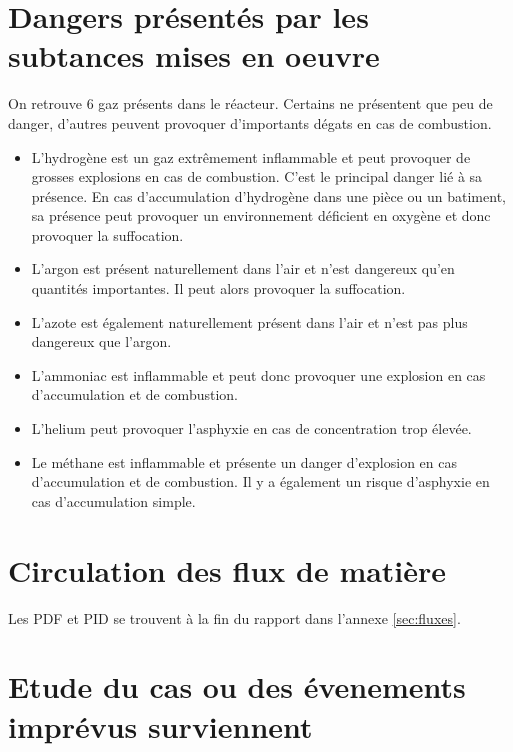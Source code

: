 \section{Dangers présentés par les subtances mises en oeuvre}

On retrouve $6$ gaz présents dans le réacteur. 
Certains ne présentent que peu de danger, 
d'autres peuvent provoquer d'importants dégats en cas de combustion.

\begin{itemize}	
	\item L'hydrogène est un gaz extrêmement inflammable et peut provoquer de grosses 
		explosions en cas de combustion. C'est le principal danger lié à sa présence. 
		En cas d'accumulation d'hydrogène dans une pièce ou un batiment, 
		sa présence peut provoquer un environnement déficient en oxygène et 
		donc provoquer la suffocation.

	\item  L'argon est présent naturellement dans l'air et n'est dangereux qu'en 
		quantités importantes. Il peut alors provoquer la suffocation.

	\item  L'azote est également naturellement présent dans l'air et n'est pas plus 
		dangereux que l'argon.

	\item  L'ammoniac est inflammable et peut donc provoquer une explosion en cas 
		d'accumulation et de combustion.

	\item  L'helium peut provoquer l'asphyxie en cas de concentration trop élevée.

	\item  Le méthane est inflammable et présente un danger d'explosion en cas 
		d'accumulation et de combustion. Il y a également un risque d'asphyxie en 
		cas d'accumulation simple.
\end{itemize}

\section{Circulation des flux de matière}

Les PDF et PID se trouvent à la fin du rapport dans l'annexe \ref{sec:fluxes}.


\section{Etude du cas ou des évenements imprévus surviennent}

